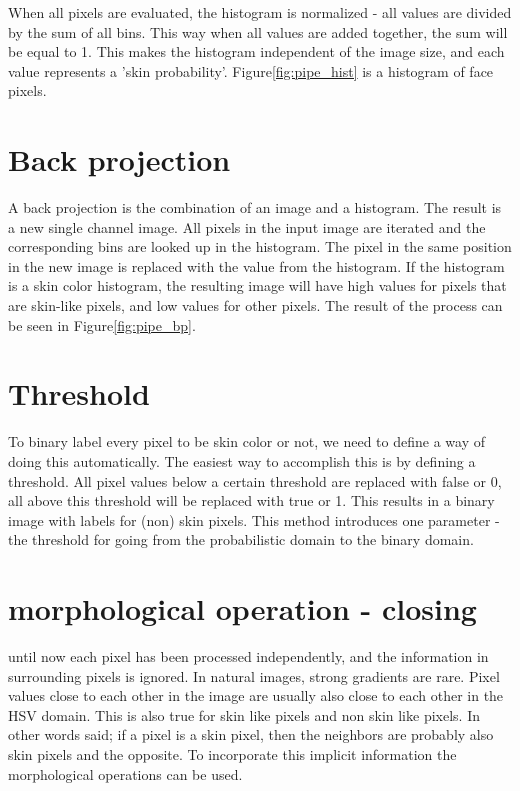 When all pixels are evaluated, the histogram is normalized - all values are divided by the sum of all bins. This way when all values are added together, the sum will be equal to 1. This makes the histogram independent of the image size, and each value represents a 'skin probability'. Figure\ref{fig:pipe_hist} is a histogram of face pixels.

\section{Back projection}
A back projection is the combination of an image and a histogram. The result is a new single channel image. All pixels in the input image are iterated and the corresponding bins are looked up in the histogram. The pixel in the same position in the new image is replaced with the value from the histogram. If the histogram is a skin color histogram, the resulting image will have high values for pixels that are skin-like pixels, and low values for other pixels. The result of the process can be seen in Figure\ref{fig:pipe_bp}.


\section{Threshold}
To binary label every pixel to be skin color or not, we need to define a way of doing this automatically. The easiest way to accomplish this is by defining a threshold. All pixel values below a certain threshold are replaced with false or 0, all above this threshold will be replaced with true or 1. This results in a binary image with labels for (non) skin pixels. This method introduces one parameter - the threshold for going from the probabilistic domain to the binary domain.

\section{morphological operation - closing}
until now each pixel has been processed independently, and the information in surrounding pixels is ignored. In natural images, strong gradients are rare. Pixel values close to each other in the image are usually also close to each other in the HSV domain. This is also true for skin like pixels and non skin like pixels. In other words said; if a pixel is a skin pixel, then the neighbors are probably also skin pixels and the opposite. To incorporate this implicit information the morphological operations can be used.

